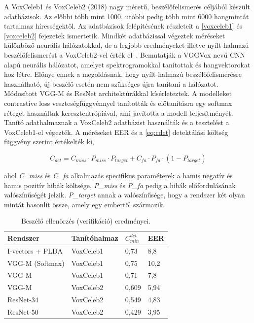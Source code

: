 A VoxCeleb1 és VoxCeleb2 (2018) nagy méretű, beszélőfelismerés céljából készült adatbázisok. Az előbbi több mint 1000, utóbbi pedig több mint 6000 hangmintát tartalmaz hírességektől. Az adatbázisok felépítésének részleteit a \ref{voxceleb1} és \ref{voxceleb2} fejezetek ismertetik. Mindkét adatbázissal végeztek méréseket különböző neurális hálózatokkal, de a legjobb eredményeket illetve nyílt-halmazú beszélőfelismerést a VoxCeleb2-vel érték el~\cite{voxceleb2}.
\newline
\newline
Bemutatják a VGGVox nevű CNN alapú neurális hálózatot, amelyet spektrogramokkal tanítottak és hangvektorokat hoz létre. Előnye ennek a megoldásnak, hogy nyílt-halmazú beszélőfelismerésre használható, új beszélő esetén nem szükséges újra tanítani a hálózatot. 
\newline
\newline
Módosított VGG-M és ResNet architektúrákkal kísérleteztek. A modelleket contrastive loss veszteségfüggvénnyel tanították és előtanításra egy softmax réteget használtak keresztentrópiával, ami javította a modell teljesítményét. Tanító adathalmaznak a VoxCeleb2 adatbázist használták és a tesztelést a VoxCeleb1-el végezték. A méréseket EER és a \ref{eq:cdet} detektálási költség függvény szerint értékelték ki,

\begin{equation} \label{eq:cdet}
C_{det} = C_{miss} \cdot P_{miss} \cdot P_{target} + C_{fa} \cdot P_{fa} \cdot (1 - P_{target})
\end{equation}

ahol \emph{C\_miss} és \emph{C\_fa} alkalmazás specifikus paraméterek a hamis negatív és hamis pozitív hibák költsége, \emph{P\_miss} és \emph{P\_fa} pedig a hibák előfordulásának valószínűségét jelzik. \emph{P\_target} annak a valószínűsége, hogy a rendszer két olyan mintát hasonlít össze, amely egy embertől származik.
\newline
\begin{table}[!ht]
	\begin{tabular}{*4l} \toprule
		\bfseries Rendszer & \bfseries Tanítóhalmaz & \bfseries $C_{min}^{det}$ & \bfseries EER \\ \midrule
		I-vectors + PLDA & VoxCeleb1 & 0,73 & 8,8 \\
		VGG-M (Softmax) & VoxCeleb1 & 0,75 & 10,2 \\
		VGG-M & VoxCeleb1 & 0,71 & 7,8 \\
		VGG-M  & VoxCeleb2 & 0,609 & 5,94 \\
		ResNet-34 & VoxCeleb2 & 0,549 & 4,83 \\
		ResNet-50 & VoxCeleb2 & 0,429 & 3,95 \\
		\bottomrule
		\hline
	\end{tabular}
	\centering
	\caption{Beszélő ellenőrzés (verifikáció) eredményei.}
	\label{fig:sincnet-verification}
\end{table}

